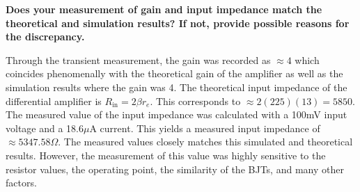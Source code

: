 \documentclass{article}
\begin{document}
\textbf{
Does your measurement of gain and input impedance match the
theoretical and simulation results? If not, provide possible
reasons for the discrepancy.
}

\vspace{1em}
Through the transient measurement, the gain was recorded as $\approx 4$ which coincides
phenomenally with the theoretical gain of the amplifier as well as the simulation
results where the gain was 4. The theoretical input impedance of the differential amplifier 
is  $R_{\text{in}} = 2\beta r_e$. This corresponds to $\approx 2(225)(13) = 5850$. The
measured value of the input impedance was calculated with a 100mV input voltage and a
18.6$\mu$A current. This yields a measured input impedance of $\approx 5347.58 \Omega$.
The measured values closely matches this simulated and theoretical results. However,
the measurement of this value was highly sensitive to the resistor values, the operating 
point, the similarity of the BJTs, and many other factors. 
\end{document}
